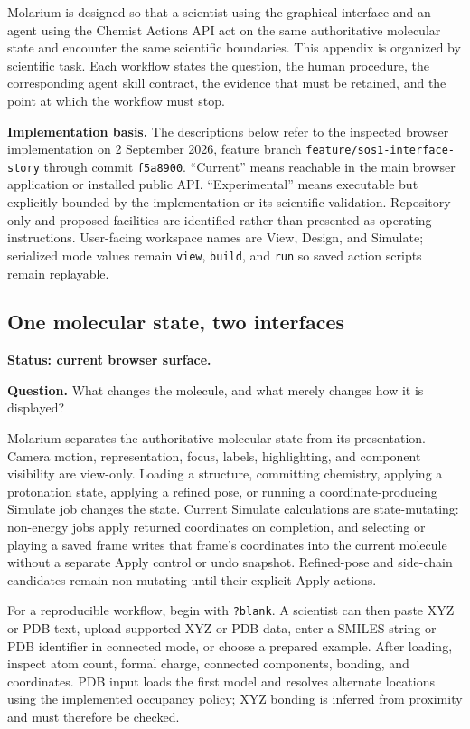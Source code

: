 \begin{small}
\setlength{\emergencystretch}{3em}

Molarium is designed so that a scientist using the graphical interface and an agent using the Chemist Actions API act on the same authoritative molecular state and encounter the same scientific boundaries. This appendix is organized by scientific task. Each workflow states the question, the human procedure, the corresponding agent skill contract, the evidence that must be retained, and the point at which the workflow must stop.

\textbf{Implementation basis.} The descriptions below refer to the inspected browser implementation on 2 September 2026, feature branch \texttt{feature/sos1-interface-story} through commit \texttt{f5a8900}. ``Current'' means reachable in the main browser application or installed public API. ``Experimental'' means executable but explicitly bounded by the implementation or its scientific validation. Repository-only and proposed facilities are identified rather than presented as operating instructions. User-facing workspace names are View, Design, and Simulate; serialized mode values remain \texttt{view}, \texttt{build}, and \texttt{run} so saved action scripts remain replayable.

\subsection{One molecular state, two interfaces}\label{appB:state}

\textbf{Status: current browser surface.}

\textbf{Question.} What changes the molecule, and what merely changes how it is displayed?

Molarium separates the authoritative molecular state from its presentation. Camera motion, representation, focus, labels, highlighting, and component visibility are view-only. Loading a structure, committing chemistry, applying a protonation state, applying a refined pose, or running a coordinate-producing Simulate job changes the state. Current Simulate calculations are state-mutating: non-energy jobs apply returned coordinates on completion, and selecting or playing a saved frame writes that frame's coordinates into the current molecule without a separate Apply control or undo snapshot. Refined-pose and side-chain candidates remain non-mutating until their explicit Apply actions.

For a reproducible workflow, begin with \texttt{?blank}. A scientist can then paste XYZ or PDB text, upload supported XYZ or PDB data, enter a SMILES string or PDB identifier in connected mode, or choose a prepared example. After loading, inspect atom count, formal charge, connected components, bonding, and coordinates. PDB input loads the first model and resolves alternate locations using the implemented occupancy policy; XYZ bonding is inferred from proximity and must therefore be checked.


\end{small}
